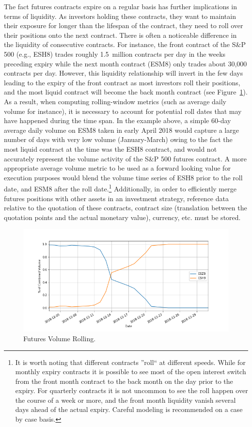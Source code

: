 \begin{itemize}
The fact futures contracts expire on a regular basis has further implications in terms of liquidity. As investors holding these contracts, they want to maintain their exposure for longer than the lifespan of the contract, they need to roll over their positions onto the next contract. There is often a noticeable difference in the liquidity of consecutive contracts. For instance, the front contract of the S\&P 500 (e.g., ESH8) trades roughly 1.5~million contracts per day in the weeks preceding expiry while the next month contract (ESM8) only trades about 30,000 contracts per day. However, this liquidity relationship will invert in the few days leading to the expiry of the front contract as most investors roll their positions, and the most liquid contract will become the back month contract (see Figure~\ref{fig:FutRoll}). As a result, when computing rolling-window metrics (such as average daily volume for instance), it is necessary to account for potential roll dates that may have happened during the time span. In the example above, a simple 60-day average daily volume on ESM8 taken in early April 2018 would capture a large number of days with very low volume (January-March) owing to the fact the most liquid contract at the time was the ESH8 contract, and would not accurately represent the volume activity of the S\&P 500 futures contract. A more appropriate average volume metric to be used as a forward looking value for execution purposes would blend the volume time series of ESH8 prior to the roll date, and ESM8 after the roll date.\footnote{It is worth noting that different contracts ''roll`` at different speeds. While for monthly expiry contracts it is possible to see most of the open interest switch from the front month contract to the back month on the day prior to the expiry. For quarterly contracts it is not uncommon to see the roll happen over the course of a week or more, and the front month liquidity vanish several days ahead of the actual expiry. Careful modeling is recommended on a case by case basis.} Additionally, in order to efficiently merge futures positions with other assets in an investment strategy, reference data relative to the quotation of these contracts, contract size (translation between the quotation points and the actual monetary value), currency, etc. must be stored.

	\begin{figure}[!ht]
	\centering
	\includegraphics[width=\textwidth]{chapters/chapter_trading_fund/figures/FutRoll.png} 
	\caption{Futures Volume Rolling.\label{fig:FutRoll}}
	\end{figure}


\end{itemize}

